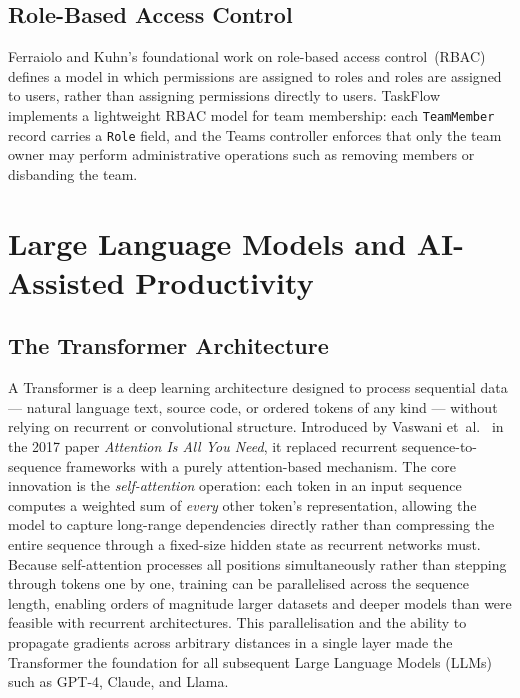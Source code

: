 \subsection*{Role-Based Access Control}

Ferraiolo and Kuhn's foundational work on role-based access
control~(RBAC)~\cite{sandhu1996rbac} defines a model in which permissions are assigned
to roles and roles are assigned to users, rather than assigning permissions directly to
users.
TaskFlow implements a lightweight RBAC model for team membership: each
\texttt{TeamMember} record carries a \texttt{Role} field, and the Teams controller
enforces that only the team owner may perform administrative operations such as removing
members or disbanding the team.

\section{Large Language Models and AI-Assisted Productivity}\label{sec:bg_ai}

\subsection*{The Transformer Architecture}

A Transformer is a deep learning architecture designed to process sequential data ---
natural language text, source code, or ordered tokens of any kind --- without relying on
recurrent or convolutional structure. Introduced by Vaswani et~al.~\cite{vaswani2017attention}
in the 2017 paper \textit{Attention Is All You Need}, it replaced recurrent
sequence-to-sequence frameworks with a purely attention-based mechanism.
The core innovation is the \emph{self-attention} operation: each token in an input
sequence computes a weighted sum of \emph{every} other token's representation, allowing
the model to capture long-range dependencies directly rather than compressing the entire
sequence through a fixed-size hidden state as recurrent networks must. Because
self-attention processes all positions simultaneously rather than stepping through tokens
one by one, training can be parallelised across the sequence length, enabling orders of
magnitude larger datasets and deeper models than were feasible with recurrent
architectures. This parallelisation and the ability to propagate gradients across
arbitrary distances in a single layer made the Transformer the foundation for all
subsequent Large Language Models (LLMs) such as GPT-4, Claude, and Llama.

